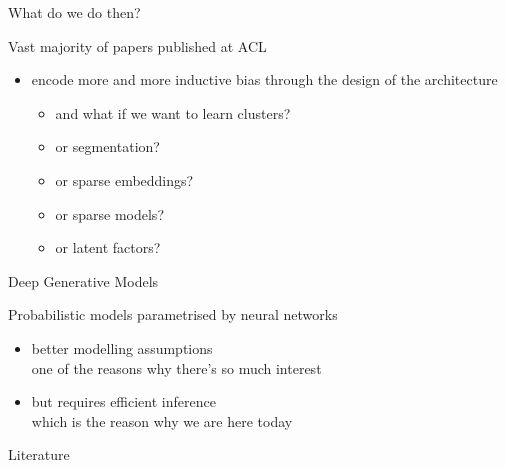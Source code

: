 \documentclass[14pt]{beamer}
\begin{document}
\begin{frame}{What do we do then?}

Vast majority of papers published at ACL

\begin{small}
\begin{figure}
\end{figure}
\end{small}
\begin{itemize}
	\item encode more and more inductive bias through the design of the architecture
	\begin{itemize}
		\item and what if we want to learn clusters?
		\item or segmentation?
		\item or sparse embeddings?
		\item or sparse models?
		\item or latent factors?
	\end{itemize}
\end{itemize}

\end{frame}

\begin{frame}{Deep Generative Models}

Probabilistic models parametrised by neural networks
\begin{itemize}
	\item better modelling assumptions\\
	one of the reasons why there's so much interest	
	\item but requires efficient inference\\
	\alert{which is the reason why we are here today}
\end{itemize}

\end{frame}



\begin{frame}[allowframebreaks]{Literature}

\small

\end{frame}
\end{document}

